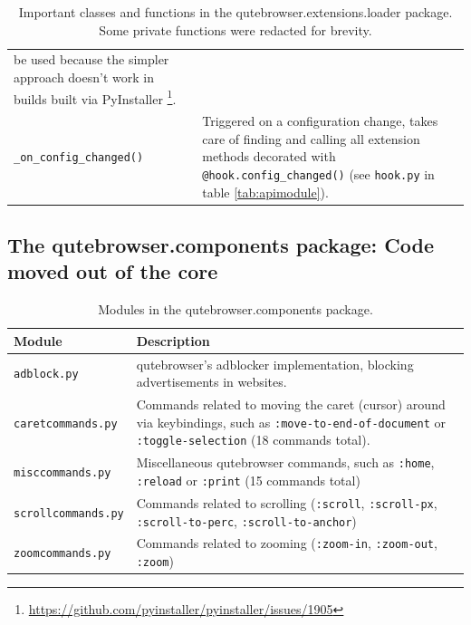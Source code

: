 \documentclass[a4paper,parskip=full,DIV=14,BCOR=15mm]{scrreprt}
\newcommand{\py}[1]{\texttt{#1}}
\begin{document}
\begin{table}[H]
\begin{tabulary}{\linewidth}{lL}
                               be used because the simpler approach doesn't work
                               in builds built via
                               PyInstaller
                               \footnote{\url{https://github.com/pyinstaller/pyinstaller/issues/1905}}. \\
    \verb|_on_config_changed()| & Triggered on a configuration change, takes
                                  care of finding and calling all extension
                                  methods decorated with
                                  \py{@hook.config_changed()} (see
                                  \verb|hook.py| in table \ref{tab:apimodule}). \\
    \bottomrule
  \end{tabulary}
  \caption[Important classes and functions in the qutebrowser.extensions.loader
  package.]{Important classes and functions in the qutebrowser.extensions.loader package.
    Some private functions were redacted for brevity.}
\end{table}

\subsection[The qutebrowser.components package]{The qutebrowser.components
  package: Code moved out of the core}
\label{sec:components}

\begin{table}[H]
  \centering
  \begin{tabulary}{\linewidth}{lL}
    \toprule
    Module & Description \\
    \midrule
    \verb|adblock.py| & qutebrowser's adblocker implementation, blocking
                         advertisements in websites. \\
    \verb|caretcommands.py| & Commands related to moving the caret
                              (cursor) around via keybindings, such as
                              \verb|:move-to-end-of-document| or
                              \verb|:toggle-selection| (18 commands total). \\
    \verb|misccommands.py| & Miscellaneous qutebrowser commands, such as
                             \verb|:home|, \verb|:reload| or \verb|:print| (15
                             commands total) \\
    \verb|scrollcommands.py| & Commands related to scrolling (\verb|:scroll|,
                               \verb|:scroll-px|, \verb|:scroll-to-perc|,
                               \verb|:scroll-to-anchor|) \\
    \verb|zoomcommands.py| & Commands related to zooming (\verb|:zoom-in|,
                             \verb|:zoom-out|, \verb|:zoom|) \\
    \bottomrule
  \end{tabulary}
  \caption{Modules in the qutebrowser.components package.}
\end{table}
\end{document}
